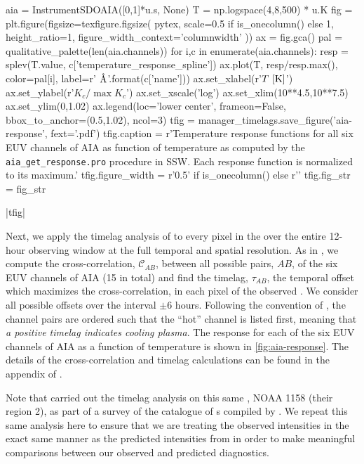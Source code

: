 \begin{pycode}
aia = InstrumentSDOAIA([0,1]*u.s, None)
T = np.logspace(4,8,500) * u.K
fig = plt.figure(figsize=texfigure.figsize(
    pytex,
    scale=0.5 if is_onecolumn() else 1,
    height_ratio=1,
    figure_width_context='columnwidth'
))
ax = fig.gca()
pal = qualitative_palette(len(aia.channels))
for i,c in enumerate(aia.channels):
    resp = splev(T.value, c['temperature_response_spline'])
    ax.plot(T, resp/resp.max(), color=pal[i], label=r'{} $\textup{{\AA}}$'.format(c['name']))
ax.set_xlabel(r'$T\,\,[\textup{K}]$')
ax.set_ylabel(r'$K_c/\max{K_c}$')
ax.set_xscale('log')
ax.set_xlim(10**4.5,10**7.5)
ax.set_ylim(0,1.02)
ax.legend(loc='lower center', frameon=False, bbox_to_anchor=(0.5,1.02), ncol=3)
tfig = manager_timelags.save_figure('aia-response', fext='.pdf')
tfig.caption = r'Temperature response functions for all six EUV channels of AIA as function of temperature as computed by the \texttt{aia\_get\_response.pro} procedure in SSW. Each response function is normalized to its maximum.'
tfig.figure_width = r'0.5\columnwidth' if is_onecolumn() else r'\columnwidth'
tfig.fig_str = fig_str
\end{pycode}
|tfig|

Next, we apply the timelag analysis of \citet{viall_evidence_2012} to every pixel in the \AR{} over the entire 12-hour observing window at the full temporal and spatial resolution. As in , we compute the cross-correlation, $\mathcal{C}_{AB}$, between all possible pairs, $AB$, of the six EUV channels of AIA (15 in total) and find the timelag, $\tau_{AB}$, the temporal offset which maximizes the cross-correlation, in each pixel of the observed \AR{}. We consider all possible offsets over the interval $\pm6$ hours. Following the convention of \citet{viall_evidence_2012}, the channel pairs are ordered such that the ``hot'' channel is listed first, meaning that \textit{a positive timelag indicates cooling plasma}. The response for each of the six EUV channels of AIA as a function of temperature is shown in \autoref{fig:aia-response}. The details of the cross-correlation and timelag calculations can be found in the appendix of .

Note that \citet{viall_survey_2017} carried out the timelag analysis on this same \AR{}, NOAA 1158 (their region 2), as part of a survey of the catalogue of \AR{}s compiled by \citet{warren_systematic_2012}. We repeat this same analysis here to ensure that we are treating the observed intensities in the exact same manner as the predicted intensities from  in order to make meaningful comparisons between our observed and predicted diagnostics.

